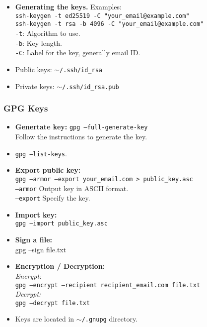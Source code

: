 \begin{itemize}
    \item \textbf{Generating the keys.} Examples:\\
            \texttt{ssh-keygen -t ed25519 -C "your\_email@example.com"}\\
            \texttt{ssh-keygen -t rsa -b 4096 -C "your\_email@example.com"}\\
            \texttt{-t}: Algorithm to use.\\
            \texttt{-b}: Key length.\\
            \texttt{-C}: Label for the key, generally email ID.\\
    \item   Public keys: \texttt{$\sim$/.ssh/id\_rsa}\\
    \item   Private keys: \texttt{$\sim$/.ssh/id\_rsa.pub}\\
\end{itemize}

\subsubsection{GPG Keys}

\begin{itemize}
\item \textbf{Genertate key:} \texttt{gpg --full-generate-key}\\
        Follow the instructions to generate the key.\\
\item \texttt{gpg --list-keys}.
\item  \textbf{Export public key:}\\
        \texttt{gpg --armor --export your\_email\@example.com > public\_key.asc}\\
            \texttt{--armor} Output key in ASCII format.\\
            \texttt{--export} Specify the key.\\
\item \textbf{Import key:}\\
        \texttt{gpg --import public\_key.asc}\\
\item \textbf{Sign a file:}\\
        gpg --sign file.txt\\
\item  \textbf{Encryption / Decryption:}\\
        \textit{Encrypt:}\\
        \texttt{gpg --encrypt --recipient recipient\_email\@example.com file.txt}\\
        \textit{Decrypt:}\\
        \texttt{gpg --decrypt file.txt}\\
\item Keys are located in \texttt{$\sim$/.gnupg} directory.
\end{itemize}


